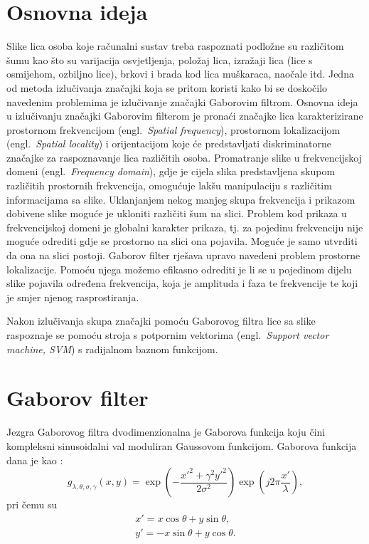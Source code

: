\documentclass{article}
\newcommand{\engl}[1]{(engl.~\emph{#1})}
\begin{document}
\section{Osnovna ideja}
Slike lica osoba koje računalni sustav treba raspoznati podložne su različitom
šumu kao što su varijacija osvjetljenja, položaj lica, izražaji lica (lice s
osmijehom, ozbiljno lice), brkovi i brada kod lica muškaraca, naočale itd. Jedna
od metoda izlučivanja značajki koja se pritom koristi kako bi se doskočilo
navedenim problemima je izlučivanje značajki Gaborovim filtrom. Osnovna ideja u
izlučivanju značajki Gaborovim filterom je pronaći značajke lica karakterizirane
prostornom frekvencijom \engl{Spatial frequency}, prostornom lokalizacijom
\engl{Spatial locality} i orijentacijom koje će predstavljati diskriminatorne
značajke za raspoznavanje lica različitih osoba. Promatranje slike u
frekvencijskoj domeni \engl{Frequency domain}, gdje je cijela slika predstavljena
skupom različitih prostornih frekvencija, omogućuje lakšu manipulaciju s
različitim informacijama sa slike. Uklanjanjem nekog manjeg skupa frekvencija i
prikazom dobivene slike moguće je ukloniti različiti šum na slici. Problem kod
prikaza u frekvencijskoj domeni je globalni karakter prikaza, tj. za
pojedinu frekvenciju nije moguće odrediti gdje se prostorno na slici ona pojavila.
Moguće je samo utvrditi da ona na slici postoji. Gaborov filter rješava
upravo navedeni problem prostorne lokalizacije. Pomoću njega možemo efikasno
odrediti je li se u pojedinom dijelu slike pojavila određena frekvencija, koja
je amplituda i faza te frekvencije te koji je smjer njenog rasprostiranja.

Nakon izlučivanja skupa značajki pomoću Gaborovog filtra lice sa slike raspoznaje
se pomoću stroja s potpornim vektorima \engl{Support vector machine,
SVM} s radijalnom baznom funkcijom.

\section{Gaborov filter}

Jezgra Gaborovog filtra dvodimenzionalna je Gaborova funkcija koju čini
kompleksni sinusoidalni val moduliran Gaussovom funkcijom. Gaborova funkcija
dana je kao \citep{petkovgabor}:
\begin{equation}
g_{\lambda,\theta,\sigma,\gamma}(x,y) = \exp\left ( -
\frac{x'^2+\gamma^2 y'^2}{2\sigma^2}\right ) \exp \left ( j2\pi
\frac{x'}{\lambda} \right ),
\label{2d-gabor}
\end{equation}
pri čemu su
\begin{eqnarray*}
x' = x \cos \theta + y \sin \theta, \\
y' = -x \sin \theta + y \cos \theta.
\end{eqnarray*}
\end{document}
